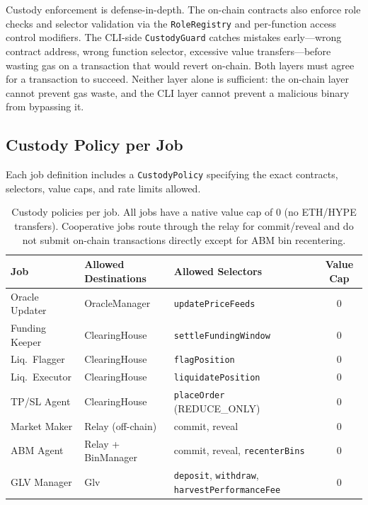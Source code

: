 \documentclass[11pt,a4paper]{article}
\begin{document}
\begin{criticalbox}
Custody enforcement is defense-in-depth. The on-chain contracts also enforce role
checks and selector validation via the \texttt{RoleRegistry} and per-function access
control modifiers. The CLI-side \texttt{CustodyGuard} catches mistakes early---wrong
contract address, wrong function selector, excessive value transfers---before wasting
gas on a transaction that would revert on-chain. Both layers must agree for a
transaction to succeed. Neither layer alone is sufficient: the on-chain layer cannot
prevent gas waste, and the CLI layer cannot prevent a malicious binary from bypassing it.
\end{criticalbox}

\subsection{Custody Policy per Job}

Each job definition includes a \texttt{CustodyPolicy} specifying the exact contracts,
selectors, value caps, and rate limits allowed.

\begin{table}[H]
\centering
\small
\begin{tabularx}{\textwidth}{l l l c}
\toprule
\textbf{Job} & \textbf{Allowed Destinations} & \textbf{Allowed Selectors} & \textbf{Value Cap} \\
\midrule
\rowcolor{keeper!8}
Oracle Updater & OracleManager & \texttt{updatePriceFeeds} & 0 \\
\rowcolor{keeper!8}
Funding Keeper & ClearingHouse & \texttt{settleFundingWindow} & 0 \\
\rowcolor{keeper!8}
Liq.\ Flagger & ClearingHouse & \texttt{flagPosition} & 0 \\
\rowcolor{operator!8}
Liq.\ Executor & ClearingHouse & \texttt{liquidatePosition} & 0 \\
\rowcolor{operator!8}
TP/SL Agent & ClearingHouse & \texttt{placeOrder} (REDUCE\_ONLY) & 0 \\
\rowcolor{cooperative!8}
Market Maker & Relay (off-chain) & commit, reveal & 0 \\
\rowcolor{cooperative!8}
ABM Agent & Relay + BinManager & commit, reveal, \texttt{recenterBins} & 0 \\
\rowcolor{managed!8}
GLV Manager & Glv & \texttt{deposit}, \texttt{withdraw}, \texttt{harvestPerformanceFee} & 0 \\
\bottomrule
\end{tabularx}
\caption{Custody policies per job. All jobs have a native value cap of 0 (no ETH/HYPE transfers). Cooperative jobs route through the relay for commit/reveal and do not submit on-chain transactions directly except for ABM bin recentering.}
\end{table}
\end{document}

